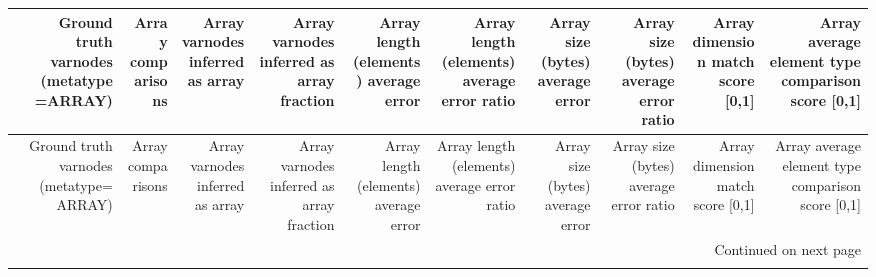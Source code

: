 \begin{longtable}{lrrrrrrrrrr}
\toprule
{} &  Ground truth varnodes (metatype=ARRAY) &  Array comparisons &  Array varnodes inferred as array &  Array varnodes inferred as array fraction &  Array length (elements) average error &  Array length (elements) average error ratio &  Array size (bytes) average error &  Array size (bytes) average error ratio &  Array dimension match score {[}0,1] &  Array average element type comparison score {[}0,1] \\
\midrule
\endfirsthead

\toprule
{} &  Ground truth varnodes (metatype=ARRAY) &  Array comparisons &  Array varnodes inferred as array &  Array varnodes inferred as array fraction &  Array length (elements) average error &  Array length (elements) average error ratio &  Array size (bytes) average error &  Array size (bytes) average error ratio &  Array dimension match score {[}0,1] &  Array average element type comparison score {[}0,1] \\
\midrule
\endhead
\midrule
\multicolumn{11}{r}{{Continued on next page}} \\
\midrule
\endfoot


\end{longtable}
